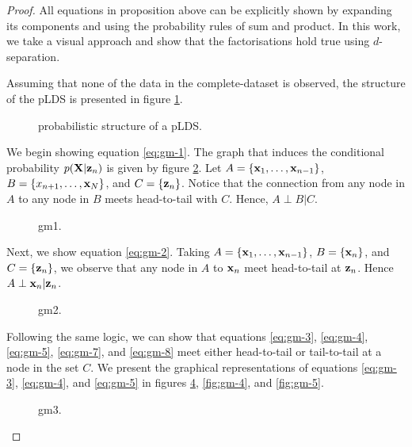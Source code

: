 \documentclass[11pt]{article}
\numberwithin{equation}{section}
\newcommand{\x}{{\bf x}}
\newcommand{\X}{{\bf X}}
\newcommand{\z}{{\bf z}}
\begin{document}
\begin{proof}
	All equations in proposition above can be explicitly shown by expanding its components and using the probability rules of sum and product. In this work, we take a visual approach and show that the factorisations hold true using $d$-separation.
	
	Assuming that none of the data in the complete-dataset is observed, the structure of the pLDS is presented in figure \ref{fig:lds-skeleton}.
	
	\begin{figure}[h!]
		\centering
		\resizebox{\columnwidth}{!}{}
		\caption{probabilistic structure of a pLDS.}
		\label{fig:lds-skeleton}
	\end{figure}

	We begin showing equation \eqref{eq:gm-1}. The graph that induces the conditional probability $p(\X \vert \z_n)$ is given by figure \ref{fig:gm-1}. Let $A = \{\x_1, \ldots, \x_{n-1}\}$, $B = \{x_{n+1}, \ldots, \x_N\}$, and $C = \{\z_n\}$. Notice that the connection from any node in $A$ to any node in $B$ meets head-to-tail with $C$. Hence, $A \perp B \vert C$.
	
	\begin{figure}[h!]
		\centering
		\resizebox{\columnwidth}{!}{}
		\caption{gm1.}
		\label{fig:gm-1}
	\end{figure}
	
	Next, we show equation \eqref{eq:gm-2}. Taking $A = \{\x_1, \ldots, \x_{n-1}\}$, $B = \{\x_n\}$, and $C = \{\z_n\}$, we observe that any node in $A$ to $\x_n$ meet head-to-tail at $\z_n$. Hence $A \perp \x_n \vert \z_n$.
	\begin{figure}[h!]
		\centering
		\resizebox{\columnwidth}{!}{}
		\caption{gm2.}
		\label{fig:gm-2}
	\end{figure}

	Following the same logic, we can show that equations \eqref{eq:gm-3}, \eqref{eq:gm-4}, \eqref{eq:gm-5}, \eqref{eq:gm-7}, and \eqref{eq:gm-8}  meet either head-to-tail or tail-to-tail at a node in the set $C$. We present the graphical representations of equations \eqref{eq:gm-3}, \eqref{eq:gm-4}, and \eqref{eq:gm-5} in figures \ref{fig:gm-3}, \ref{fig:gm-4}, and \ref{fig:gm-5}.
	\begin{figure}[h!]
		\centering
		\resizebox{\columnwidth}{!}{}
		\caption{gm3.}
		\label{fig:gm-3}
	\end{figure}
	

\end{proof}
\end{document}

